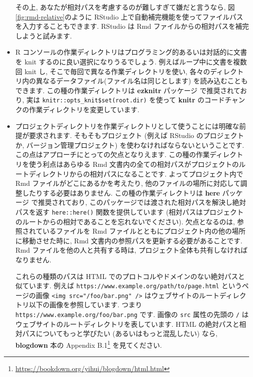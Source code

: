 \documentclass[
  11pt,
  lualatex,ja=standard,jafont=noto]{bxjsreport}
\renewcommand{\href}[2]{#2\footnote{\url{#1}}}
\begin{document}
\begin{itemize}
  その上, あなたが相対パスを考慮するのが難しすぎて嫌だと言うなら, 図\ref{fig:rmd-relative}のように RStudio 上で自動補完機能を使ってファイルパスを入力することもできます. RStudio は Rmd ファイルからの相対パスを補完しようと試みます.
\item
  R コンソールの作業ディレクトリはプログラミング的あるいは対話的に文書を knit するのに良い選択になりうるでしょう. 例えばループ中に文書を複数回 knit し, そこで毎回で異なる作業ディレクトリを使い, 各々のディレクトリ内の異なるデータファイル(ファイル名は同じとします) を読み込むこともできます. この種の作業ディレクトリは \textbf{ezknitr} パッケージ \autocite{R-ezknitr} で推奨されており, 実は \texttt{knitr::opts\_knit\$set(root.dir)} を使って \textbf{knitr} のコードチャンクの作業ディレクトリを変更しています.
\item
  プロジェクトディレクトリを作業ディレクトリとして使うことには明確な前提が要求されます. そもそもプロジェクト (例えば RStudio のプロジェクトか, バージョン管理プロジェクト) を使わなければならないということです. この点はアプローチにとっての欠点となりえます. この種の作業ディレクトリを使う利点はあらゆる Rmd 文書内の全ての相対パスがプロジェクトのルートディレクトリからの相対パスになることです. よってプロジェクト内で Rmd ファイルがどこにあるかを考えたり, 他のファイルの場所に対応して調整したりする必要はありません. この種の作業ディレクトリは \textbf{here} パッケージ \autocite{R-here} で推奨されており, このパッケージでは渡された相対パスを解決し絶対パスを返す \texttt{here::here()} 関数を提供しています (相対パスはプロジェクトのルートからの相対であることを忘れないでください). 欠点となるのは, 参照されているファイルを Rmd ファイルとともにプロジェクト内の他の場所に移動させた時に, Rmd 文書内の参照パスを更新する必要があることです. Rmd ファイルを他の人と共有する時は, プロジェクト全体も共有しなければなりません.

  これらの種類のパスは HTML でのプロトコルやドメインのない絶対パスと似ています. 例えば \texttt{https://www.example.org/path/to/page.html} というページの画像 \texttt{\textless{}img\ src="/foo/bar.png"\ /\textgreater{}} はウェブサイトのルートディレクトリ以下の画像を参照しています. つまり \texttt{https://www.example.org/foo/bar.png} です. 画像の \texttt{src} 属性の先頭の \texttt{/} はウェブサイトのルートディレクトリを表しています. HTML の絶対パスと相対パスについてもっと学びたい (あるいはもっと混乱したい) なら, \href{https://bookdown.org/yihui/blogdown/html.html}{\textbf{blogdown} 本の Appendix B.1} \autocite{blogdown2017} を見てください.
\end{itemize}
\end{document}
